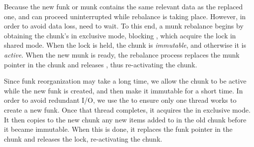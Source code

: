 Because the new funk or munk contains the same relevant data as the replaced one, 
 and  can proceed uninterrupted while rebalance is taking place. 
However, in order to avoid data loss,  need to wait. 
To this end, a munk rebalance begins by obtaining the chunk's  in exclusive mode,
blocking , which acquire the lock in shared mode.
When the lock is held, the chunk is \emph{immutable}, and otherwise it is \emph{active}. 
When the new munk is ready, the rebalance process replaces the munk pointer in the chunk and releases , thus 
re-activating the chunk.

Since funk reorganization may take a long time, we allow the chunk to be active while the new funk is created,
and then make it immutable for a short time. In order to avoid redundant I/O, 
we use the  to ensure only one thread works to create a new funk.  Once that thread
completes, it acquires the  in exclusive mode.
It then copies to the new chunk any new items added to   in the old chunk before it became immutable. 
When this is done, it replaces the funk pointer in the chunk and releases the lock, re-activating the chunk.

